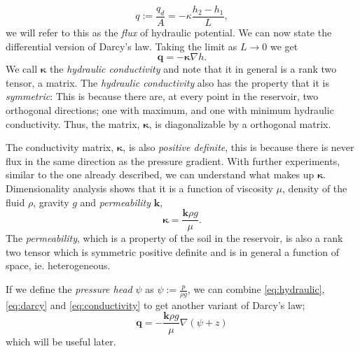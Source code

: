 \documentclass[../Main/main.tex]{subfiles}
\begin{document}
\begin{equation*}
q := \frac{q_d}{A} = -\kappa \frac{h_2-h_1}{L},
\end{equation*}
we will refer to this as the \emph{flux} of hydraulic potential. We can now state the differential version of Darcy's law. Taking the limit as $L\rightarrow 0$ we get 
\begin{equation}\label{eq:darcy}
\bm{q} = -\bm{\kappa} \nabla h.
\end{equation}
We call $\bm{\kappa}$ the \emph{hydraulic conductivity} and note that it in general is a rank two tensor, a matrix. The \emph{hydraulic conductivity} also has the property that it is \emph{symmetric}: This is because there are, at every point in the reservoir, two orthogonal directions; one with maximum, and one with minimum hydraulic conductivity. Thus, the matrix, $\bm{\kappa}$, is diagonalizable by a orthogonal matrix.\par
The conductivity matrix, $\bm{\kappa}$, is also \emph{positive definite}, this is because there is never flux in the same direction as the pressure gradient. 
With further experiments, similar to the one already described, we can understand what makes up $\bm{\kappa}$. Dimensionality analysis shows that it is  a function of viscosity $\mu$, density of the fluid $\rho$, gravity $g$ and \emph{permeability} $\bm{k}$,
\begin{equation} \label{eq:conductivity}
\bm{\kappa} = \frac{\bm{k} \rho g}{\mu}.
\end{equation}
The \emph{permeability}, which is a property of the soil in the reservoir, is also a rank two tensor which is symmetric positive definite and is in general a function of space, ie. heterogeneous.
\par If we define the \emph{pressure head} $\psi$ as $\psi := \frac{p}{\rho g}$, we can combine \eqref{eq:hydraulic}, \eqref{eq:darcy} and \eqref{eq:conductivity} to get another variant of Darcy's law;
\begin{equation}\label{eq:darcyv2}
\bm{q} = -\frac{\bm{k}\rho g}{\mu}\nabla(\psi + z)
\end{equation}
 which will be useful later.
\end{document}
